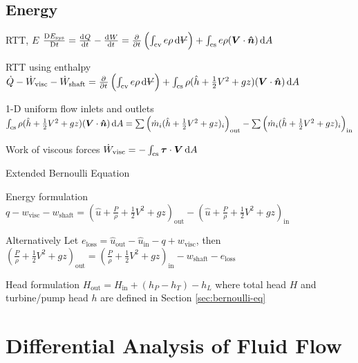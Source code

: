 \documentclass{article}
\begin{document}
\subsection{Energy}
\begin{description*}
\item[RTT, $E$]
  \(\frac{\Dif E_\mathrm{sys}}{\Dif t}
  = \od{Q}{t}-\od{W}{t}
  = \pd{}{t}\left(\int_\mathrm{cv}e\rho\dif{\volsym}\right)
  + \int_\mathrm{cs}e\rho(\vec{V}\cdot\uvec{n})\dif{A}\)
\item[RTT using enthalpy]
  \(\dot{Q}-\dot{W}_\mathrm{visc}-\dot{W}_\mathrm{shaft}
  = \pd{}{t}\left(\int_\mathrm{cv}e\rho\dif{\volsym}\right)
  + \int_\mathrm{cs}\rho(\hat{h}+\frac{1}{2}V^2+gz)(\vec{V}\cdot\uvec{n})\dif{A}\)
\item[1-D uniform flow inlets and outlets]~\\
  \(\int_\mathrm{cs}\rho(\hat{h}+\frac{1}{2}V^2+gz)(\vec{V}\cdot\uvec{n})\dif{A}
  = \sum\left(\dot{m}_i(\hat{h}+\frac{1}{2}V^2+gz)_i\right)_\mathrm{out}
  - \sum\left(\dot{m}_i(\hat{h}+\frac{1}{2}V^2+gz)_i\right)_\mathrm{in}\)
\item[Work of viscous forces]
  \(\dot{W}_\mathrm{visc} = -\int_\mathrm{cs}\vec\tau\cdot\vec{V}\dif{A}\)
\item[Extended Bernoulli Equation]~
  \begin{description*}
  \item[Energy formulation]
    \(q - w_\mathrm{visc} - w_\mathrm{shaft}
    = \left(\hat{u}+\frac{P}{\rho}+\frac{1}{2}V^2+gz\right)_\mathrm{out}
    - \left(\hat{u}+\frac{P}{\rho}+\frac{1}{2}V^2+gz\right)_\mathrm{in}\)
  \item[Alternatively]
    Let \(e_\mathrm{loss} = \hat{u}_\mathrm{out}-\hat{u}_\mathrm{in}-q+w_\mathrm{visc}\), then \\
    \(\left(\frac{P}{\rho}+\frac{1}{2}V^2+gz\right)_\mathrm{out}
    = \left(\frac{P}{\rho}+\frac{1}{2}V^2+gz\right)_\mathrm{in}
    - w_\mathrm{shaft} - e_\mathrm{loss}\)
  \item[Head formulation]
    \(H_\mathrm{out} = H_\mathrm{in} + (h_P-h_T) - h_L\)
    where total head $H$ and turbine\slash{}pump head $h$ are defined in
    Section \ref{sec:bernoulli-eq}
  \end{description*}
\end{description*}

\section{Differential Analysis of Fluid Flow}
\end{document}
